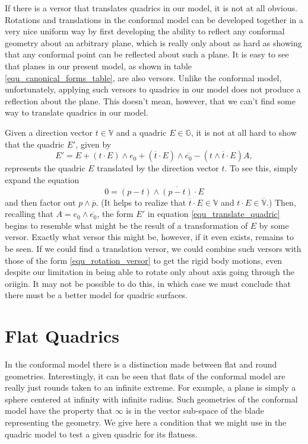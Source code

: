 \documentclass{birkjour}
\theoremstyle{definition}
\theoremstyle{remark}
\numberwithin{equation}{section}
\newcommand{\G}{\mathbb{G}}
\newcommand{\V}{\mathbb{V}}
\newcommand{\Alpha}{A}
\begin{document}
If there is a versor that translates quadrics in our model, it is not at all obvious.
Rotations and translations in the conformal model can be developed together in
a very nice uniform way by first developing the ability to reflect any conformal
geometry about an arbitrary plane, which is really only about as hard as showing
that any conformal point can be reflected about such a plane.
It is easy to see that planes in our present model, as shown
in table \eqref{equ_canonical_forms_table}, are also versors.  Unlike the conformal
model, unfortunately, applying such versors to quadrics in our model does not
produce a reflection about the plane.  This doesn't mean, however, that we can't
find some way to translate quadrics in our model.

Given a direction vector $t\in\V$ and a quadric $E\in\G$, it is not at all hard
to show that the quadric $E'$, given by
\begin{equation}\label{equ_translate_quadric}
E' = E + (t\cdot E)\wedge e_0 + (\overline{t}\cdot E)\wedge\overline{e_0}
- (t\wedge\overline{t}\cdot E)\Alpha,
\end{equation}
represents the quadric $E$ translated by the direction vector $t$.  To see this,
simply expand the equation
\begin{equation}
0 = (p-t)\wedge\overline{(p-t)}\cdot E
\end{equation}
and then factor out $p\wedge\overline{p}$.
(It helps to realize that $\overline{t}\cdot E\in\V$ and $t\cdot E\in\overline{\V}$.)
Then, recalling
that $\Alpha=e_0\wedge\overline{e_0}$, the form $E'$ in equation \eqref{equ_translate_quadric}
begins to resemble what might be the result of a transformation of $E$ by some versor.
Exactly what versor this might be, however, if it even exists, remains to be seen.
If we could find a translation versor, we could combine such versors with
those of the form \eqref{equ_rotation_versor} to get the rigid body motions,
even despite our limitation
in being able to rotate only about axis going through the oriigin.
It may not be possible to do this, in which case we must conclude that
there must be a better model for quadric surfaces.

\section{Flat Quadrics}

In the conformal model there is a distinction made between flat and round
geometries.  Interestingly, it can be seen that flats of the conformal model
are really just rounds taken to an infinite extreme.  For example, a plane
is simply a sphere centered at infinity with infinite radius.  Such geometries
of the conformal model have the property that $\infty$ is in the vector
sub-space of the blade representing the geometry.  We give here a
condition that we might use in the quadric model to test a given quadric
for its flatness.
\end{document}
